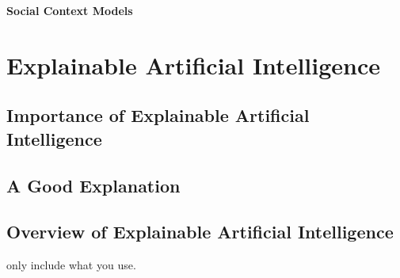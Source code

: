 \textbf{Social Context Models}








\section{Explainable Artificial Intelligence}
\label{sec:explainableArtificialIntelligence}

\subsection{Importance of Explainable Artificial Intelligence}

\subsection{A Good Explanation}

\subsection{Overview of Explainable Artificial Intelligence}
only include what you use.
